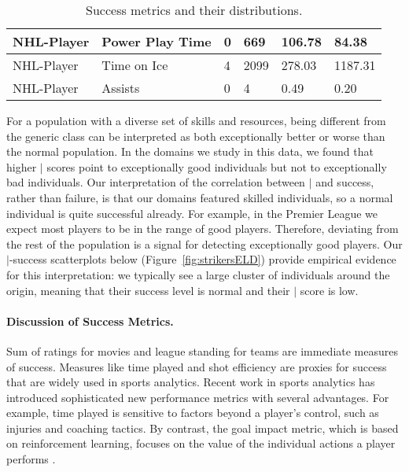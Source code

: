 {\begin{table}[htbp]
{\begin{tabular}{llllll}
			NHL-Player&Power Play Time& 0 & 669 & 106.78 & 84.38\\ \hline			
			NHL-Player&Time on Ice& 4 & 2099 & 278.03 & 1187.31\\ \hline								NHL-Player&Assists& 0 & 4 & 0.49 & 0.20\\ \hline			
		\end{tabular}}
		\caption{Success metrics and their distributions.\label{table:metrics}}	
	\end{table}



For a population with a diverse set of skills and resources,
being different from the generic class can be interpreted as both exceptionally better or worse than the normal population. In the domains we study in this data, we found that higher $\mid$ scores point to exceptionally good individuals but not to exceptionally bad individuals. Our interpretation of the correlation between $\mid$ and success, rather than failure, is that our domains featured skilled individuals, so a normal individual is quite successful already. 
For example, in the Premier League we expect most players to be in the range of good players. Therefore, deviating from the rest of the population is a signal for detecting exceptionally good players. Our $\mid$-success scatterplots below (Figure~\ref{fig:strikersELD}) provide empirical evidence for this interpretation: we typically see a large cluster of individuals around the origin, meaning that their success level is normal and their $\mid$ score is low. %

\paragraph{Discussion of Success Metrics.}
Sum of ratings for movies and league standing for teams are immediate measures of success. Measures like time played and shot efficiency are proxies for success that are widely used in sports analytics. 
Recent work in sports analytics has introduced sophisticated new performance metrics with several advantages. For example, time played is sensitive to factors beyond a player's control, such as injuries and coaching tactics.  By contrast, the goal impact metric, which is based on reinforcement learning, focuses on the value of the individual actions a player performs \citep{Routley2015a,Liu2018}. 

}
